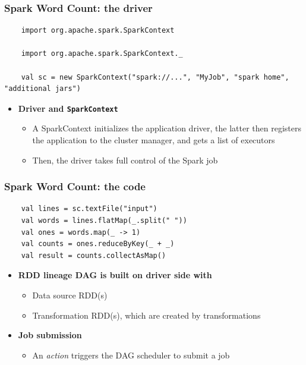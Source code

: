 \begin{frame}[fragile] 
\frametitle{Spark Word Count: the driver}
\begin{lstlisting}
	import org.apache.spark.SparkContext

	import org.apache.spark.SparkContext._

	val sc = new SparkContext("spark://...", "MyJob", "spark home", "additional jars") 
\end{lstlisting}

\begin{itemize}
	\item {\bf Driver and \texttt{SparkContext}}
	\begin{itemize}
		\item A SparkContext initializes the application driver, the latter then registers the application to the cluster manager, and gets a list of executors
		\item Then, the driver takes full control of the Spark job
	\end{itemize}
\end{itemize}

\end{frame}

\begin{frame}[fragile] 
\frametitle{Spark Word Count: the code}
\begin{lstlisting}
	val lines = sc.textFile("input")
	val words = lines.flatMap(_.split(" ")) 
	val ones = words.map(_ -> 1)
	val counts = ones.reduceByKey(_ + _) 
	val result = counts.collectAsMap()
\end{lstlisting}

\begin{itemize}
	\item {\bf RDD lineage DAG is built on driver side with}
	\begin{itemize}
		\item Data source RDD(s)
		\item Transformation RDD(s), which are created by transformations
	\end{itemize}

	\vspace{10pt}

	\item {\bf Job submission}
	\begin{itemize}
		\item An \emph{action} triggers the DAG scheduler to submit a job
	\end{itemize}
\end{itemize}

\end{frame}

